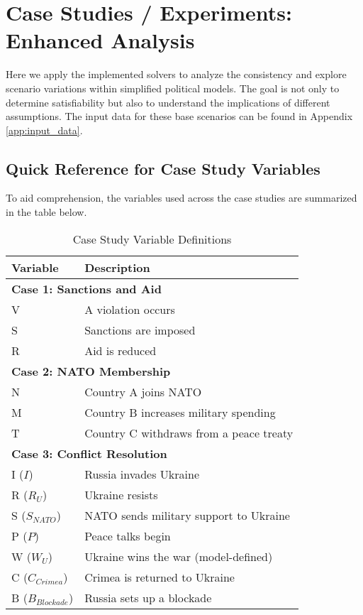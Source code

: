 \documentclass[11pt, a4paper]{article}
\begin{document}
\section{Case Studies / Experiments: Enhanced Analysis} \label{sec:casestudies}

Here we apply the implemented solvers to analyze the consistency and explore scenario variations within simplified political models. The goal is not only to determine satisfiability but also to understand the implications of different assumptions. The input data for these base scenarios can be found in Appendix \ref{app:input_data}.

\subsection*{Quick Reference for Case Study Variables}
To aid comprehension, the variables used across the case studies are summarized in the table below.

\begin{table}[h!]
\centering
\caption{Case Study Variable Definitions}
\label{tab:variable_definitions}
\begin{tabular}{@{}ll@{}}
\toprule
\textbf{Variable} & \textbf{Description} \\ \midrule
\multicolumn{2}{l}{\textbf{Case 1: Sanctions and Aid}} \\
V & A violation occurs \\
S & Sanctions are imposed \\
R & Aid is reduced \\ \midrule
\multicolumn{2}{l}{\textbf{Case 2: NATO Membership}} \\
N & Country A joins NATO \\
M & Country B increases military spending \\
T & Country C withdraws from a peace treaty \\ \midrule
\multicolumn{2}{l}{\textbf{Case 3: Conflict Resolution}} \\
I ($I$) & Russia invades Ukraine \\
R ($R_U$) & Ukraine resists \\
S ($S_{NATO}$) & NATO sends military support to Ukraine \\
P ($P$) & Peace talks begin \\
W ($W_U$) & Ukraine wins the war (model-defined) \\
C ($C_{Crimea}$) & Crimea is returned to Ukraine \\
B ($B_{Blockade}$) & Russia sets up a blockade \\ \bottomrule
\end{tabular}
\end{table}
\end{document}
